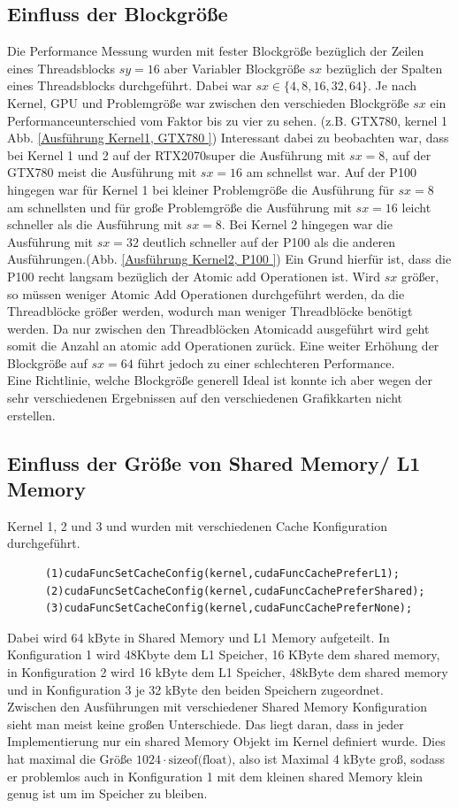 \documentclass[10pt,a4paper]{article}
\begin{document}
	  \subsection{Einfluss der Blockgröße}
	  Die Performance Messung wurden mit fester Blockgröße bezüglich der Zeilen eines Threadsblocks $sy=16$ aber Variabler Blockgröße $sx$ bezüglich der Spalten eines Threadsblocks durchgeführt. Dabei war $sx\in\{4,8,16,32,64\}$. Je nach Kernel, GPU und Problemgröße war zwischen den verschieden Blockgröße $sx$ ein Performanceunterschied vom Faktor bis zu vier zu sehen. (z.B. GTX780, kernel 1 Abb. \ref{Ausführung Kernel1, GTX780 }) Interessant dabei zu beobachten war, dass bei Kernel 1 und 2 auf der RTX2070super die Ausführung mit $sx=8$, auf der GTX780 meist die Ausführung mit $sx=16$ am schnellst war. Auf der P100 hingegen war für Kernel 1 bei kleiner Problemgröße die Ausführung für $sx=8$ am schnellsten und für große Problemgröße die Ausführung mit $sx=16$ leicht schneller als die Ausführung mit $sx=8$. Bei Kernel 2 hingegen war die Ausführung mit $sx=32$ deutlich schneller auf der P100 als die anderen Ausführungen.(Abb. \ref{Ausführung Kernel2, P100 }) Ein Grund hierfür ist, dass die P100 recht langsam bezüglich der Atomic add Operationen ist. Wird $sx$ größer, so müssen weniger Atomic Add Operationen durchgeführt werden, da die Threadblöcke größer werden, wodurch man weniger Threadblöcke benötigt werden. Da nur zwischen den Threadblöcken Atomicadd ausgeführt wird geht somit die Anzahl an atomic add Operationen zurück. Eine weiter Erhöhung der Blockgröße auf $sx=64$ führt jedoch zu einer schlechteren Performance. \\
	  Eine Richtlinie, welche Blockgröße generell Ideal ist konnte ich aber wegen der sehr verschiedenen Ergebnissen auf den verschiedenen Grafikkarten nicht erstellen.
	 
	  \subsection{Einfluss der Größe von Shared Memory/ L1 Memory}
	  Kernel 1, 2 und 3 und wurden mit verschiedenen Cache Konfiguration durchgeführt.
	  \begin{lstlisting}
	  (1)cudaFuncSetCacheConfig(kernel,cudaFuncCachePreferL1);
	  (2)cudaFuncSetCacheConfig(kernel,cudaFuncCachePreferShared);
	  (3)cudaFuncSetCacheConfig(kernel,cudaFuncCachePreferNone);  
	  \end{lstlisting}
		Dabei wird 64 kByte in Shared Memory und L1 Memory aufgeteilt. In Konfiguration 1 wird 48Kbyte dem L1 Speicher, 16 KByte dem shared memory, in Konfiguration 2 wird 16 kByte dem L1 Speicher, 48kByte dem shared memory und in Konfiguration 3 je 32 kByte den beiden Speichern zugeordnet. 
		\\ Zwischen den Ausführungen mit verschiedener Shared Memory Konfiguration sieht man meist keine großen Unterschiede. Das liegt daran, dass in jeder Implementierung nur ein shared Memory Objekt im Kernel definiert wurde. Dies hat maximal die Größe $1024\cdot \text {sizeof(float)}$, also ist Maximal 4 kByte groß, sodass er problemlos auch in Konfiguration 1 mit dem kleinen shared Memory klein genug ist um im Speicher zu bleiben.
\end{document}
